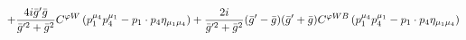 %
\begin{dmath*}
%
  +  \frac{4 i {\bar g}^\prime {\bar g}{}}{{\bar g}^{\prime 2} + {\bar g}{}^2}C^{ \varphi  W} \left(p_1^{\mu_4} p_4^{\mu_1} - p_{1}\nobreak\cdot\nobreak{}p_{4} \eta_{\mu_1 \mu_4}\right)  +  \frac{2 i}{{\bar g}^{\prime 2} + {\bar g}{}^2}({\bar g}^\prime - {\bar g}{}) ({\bar g}^\prime + {\bar g}{}) C^{ \varphi  WB} \left(p_1^{\mu_4} p_4^{\mu_1} - p_{1}\nobreak\cdot\nobreak{}p_{4} \eta_{\mu_1 \mu_4}\right)
%
\end{dmath*}
%

